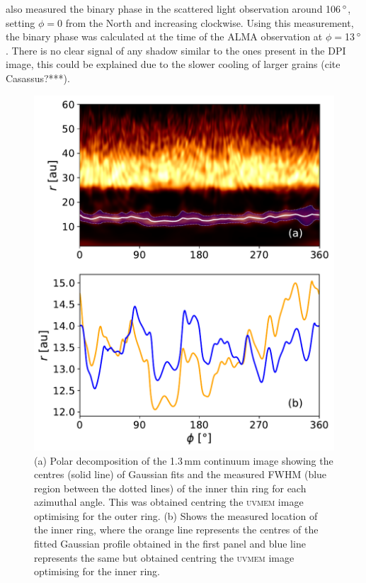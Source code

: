 \documentclass[letters, usenatbib]{mnras}
\begin{document}
\citet{dOrazi} also measured the binary phase in the scattered light observation around 106\,$\hbox{$^\circ$}$, setting $\phi=$0 from the North and increasing clockwise. Using this measurement, the binary phase was calculated at the time of the ALMA observation at $\phi=$13\,$\hbox{$^\circ$}$. There is no clear signal of any shadow similar to the ones present in the DPI image, this could be explained due to the slower cooling of larger grains (cite Casassus?***).

\begin{figure}
    \includegraphics[width=\columnwidth]{polar_ring_aprox_and_diff_inner.pdf}
    \caption{(a) Polar decomposition of the 1.3\,mm continuum image showing the centres (solid line) of Gaussian fits and the measured FWHM (blue region between the dotted lines) of the inner thin ring for each azimuthal angle. This was obtained centring the \textsc{uvmem} image optimising for the outer ring. (b) Shows the measured location of the inner ring, where the orange line represents the centres of the fitted Gaussian profile obtained in the first panel and blue line represents the same but obtained centring the \textsc{uvmem} image optimising for the inner ring.}
    \label{fig:polarring}
\end{figure}
\end{document}
